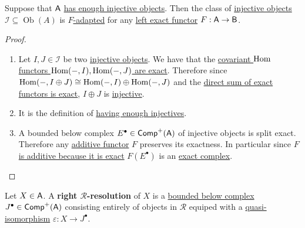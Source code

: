 \documentclass[../../../main]{subfiles}
\begin{document}
\begin{lemma}\label{lemma:injective-objects-are-adapted}
  Suppose that \(\category{A}\) \hyperref[def:enough-injectives-projectives]{has enough injective objects}.
  Then the class of \hyperref[def:injective-projective-object]{injective objects} \(\mathcal{I} \subseteq \operatorname{Ob}(A)\) is \hyperref[def:adapted-class-of-objects]{\(F\)-adapted} for any \hyperref[def:exact-functor]{left exact functor} \(F: \category{A} \to \category{B}\).
\end{lemma}
\begin{proof}~
  \begin{enumerate}[label=\(\mathcal{R}\).\arabic*), ref=\(\mathcal{R}\).\arabic*]
    \item Let \(I, J \in \mathcal{I}\) be two \hyperref[def:injective-projective-object]{injective objects}.
          We have that the \hyperref[]{covariant \(\Hom\) functors \(\Hom(-, I), \Hom(-, J)\) are exact}.
          Therefore since {\color{red} \(\Hom(-, I \oplus J) \cong \Hom(-, I) \oplus \Hom(-, J)\)} and the {\color{red} \hyperref[]{direct sum of exact functors is exact}}, \(I \oplus J\) is \hyperref[def:injective-object]{injective}.
    \item It is the definition of \hyperref[def:enough-injectives-projectives]{having enough injectives}.
    \item {\color{red} A bounded below complex \(E^{\bullet} \in \Complex[+]{\category{A}}\) of injective objects is split exact}.
          Therefore {\color{red} any \hyperref[def:additive-functor]{additive functor} \(F\) preserves its exactness}.
          In particular since \hyperref[lemma:exact-is-additive]{\(F\) is additive because it is exact} \(F(E^{\bullet})\) is an \hyperref[def:exact-complex]{exact complex}.
  \end{enumerate}
\end{proof}



\begin{definition}\label{def:right-R-resolution}
  Let \(X \in \category{A}\).
  A \textbf{right \(\mathcal{R}\)-resolution} of \(X\) is a \hyperref[def:bounded-complexes]{bounded below complex} \(J^{\bullet} \in \Complex[+]{\category{A}}\) consisting entirely of objects in \(\mathcal{R}\) equiped with a \hyperref[def:quasi-isomorphism]{quasi-isomorphism} \(\varepsilon: X \to J^{\bullet}\).
\end{definition}
\end{document}
